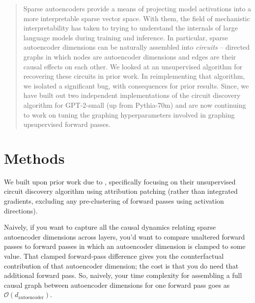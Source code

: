 \documentclass[10pt]{article}
\begin{document}

\printAffiliationsAndNotice{}

\begin{abstract}
Sparse autoencoders provide a means of projecting model activations into a more interpretable sparse vector space. With them, the field of mechanistic interpretability has taken to trying to understand the internals of large language models during training and inference. In particular, sparse autoencoder dimensions can be naturally assembled into \textit{circuits} -- directed graphs in which nodes are autoencoder dimensions and edges are their causal effects on each other. We looked at an unsupervised algorithm for recovering these circuits in prior work. In reimplementing that algorithm, we isolated a significant bug, with consequences for prior results. Since, we have built out two independent implementations of the circuit discovery algorithm for GPT-2-small (up from Pythia-70m) and are now continuing to work on tuning the graphing hyperparameters involved in graphing upsupervised forward passes.
\end{abstract}

\section{Methods}
We built upon prior work due to \citet{Marks2024}, specifically focusing on their unsupervised circuit discovery algorithm using attribution patching (rather than integrated gradients, excluding any pre-clustering of forward passes using activation directions).

Naively, if you want to capture all the causal dynamics relating sparse autoencoder dimensions across layers, you'd want to compare unaltered forward passes to forward passes in which an autoencoder dimension is clamped to some value. That clamped forward-pass difference gives you the counterfactual contribution of that autoencoder dimension; the cost is that you do need that additional forward pass. So, naively, your time complexity for assembling a full causal graph between autoencoder dimensions for one forward pass goes as $\mathcal{O}(d_\text{autoencoder})$.
\end{document}
